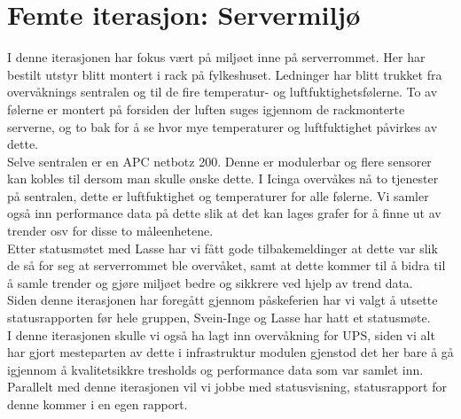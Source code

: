 

\date{Fredag 29. Mars 2013}



\maketitle
\section*{Femte iterasjon: Servermiljø}

\noindent I denne iterasjonen har fokus vært på miljøet inne på serverrommet. Her har bestilt utstyr blitt montert i rack på fylkeshuset. Ledninger har blitt trukket fra overvåknings sentralen og til de fire temperatur- og luftfuktighetsfølerne. To av følerne er montert på forsiden der luften suges igjennom de rackmonterte serverne, og to bak for å se hvor mye temperaturer og luftfuktighet påvirkes av dette.\\

\noindent Selve sentralen er en APC netbotz 200. Denne er modulerbar og flere sensorer kan kobles til dersom man skulle ønske dette. I Icinga overvåkes nå to tjenester på sentralen, dette er luftfuktighet og temperaturer for alle følerne. Vi samler også inn performance data på dette slik at det kan lages grafer for å finne ut av trender osv for disse to måleenhetene.\\

\noindent Etter statusmøtet med Lasse har vi fått gode tilbakemeldinger at dette var slik de så for seg at serverrommet ble overvåket, samt at dette kommer til å bidra til å samle trender og gjøre miljøet bedre og sikkrere ved hjelp av trend data.\\

\noindent Siden denne iterasjonen har foregått gjennom påskeferien har vi valgt å utsette statusrapporten før hele gruppen, Svein-Inge og Lasse har hatt et statusmøte.\\

\noindent I denne iterasjonen skulle vi også ha lagt inn overvåkning for UPS, siden vi alt har gjort mesteparten av dette i infrastruktur modulen gjenstod det her bare å gå igjennom å kvalitetsikkre tresholds og performance data som var samlet inn.\\

\noindent Parallelt med denne iterasjonen vil vi jobbe med statusvisning, statusrapport for denne kommer i en egen rapport.\\


